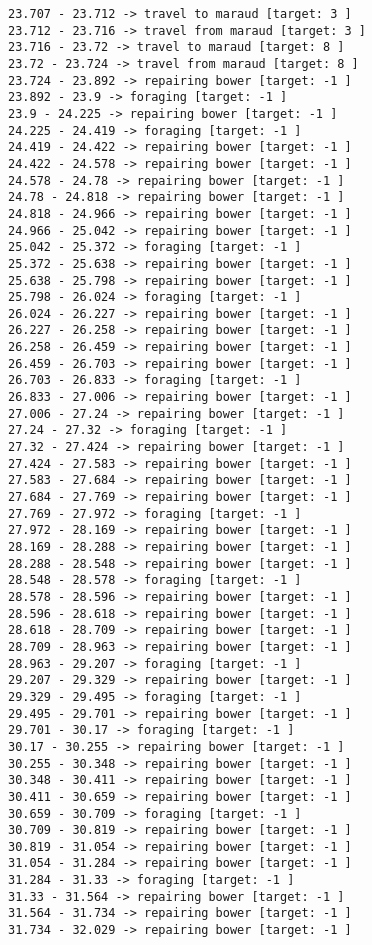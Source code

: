 \documentclass[11pt]{article}
\begin{document}
\begin{Verbatim}[commandchars=\\\{\}]
23.707 - 23.712 -> travel to maraud [target: 3 ]
23.712 - 23.716 -> travel from maraud [target: 3 ]
23.716 - 23.72 -> travel to maraud [target: 8 ]
23.72 - 23.724 -> travel from maraud [target: 8 ]
23.724 - 23.892 -> repairing bower [target: -1 ]
23.892 - 23.9 -> foraging [target: -1 ]
23.9 - 24.225 -> repairing bower [target: -1 ]
24.225 - 24.419 -> foraging [target: -1 ]
24.419 - 24.422 -> repairing bower [target: -1 ]
24.422 - 24.578 -> repairing bower [target: -1 ]
24.578 - 24.78 -> repairing bower [target: -1 ]
24.78 - 24.818 -> repairing bower [target: -1 ]
24.818 - 24.966 -> repairing bower [target: -1 ]
24.966 - 25.042 -> repairing bower [target: -1 ]
25.042 - 25.372 -> foraging [target: -1 ]
25.372 - 25.638 -> repairing bower [target: -1 ]
25.638 - 25.798 -> repairing bower [target: -1 ]
25.798 - 26.024 -> foraging [target: -1 ]
26.024 - 26.227 -> repairing bower [target: -1 ]
26.227 - 26.258 -> repairing bower [target: -1 ]
26.258 - 26.459 -> repairing bower [target: -1 ]
26.459 - 26.703 -> repairing bower [target: -1 ]
26.703 - 26.833 -> foraging [target: -1 ]
26.833 - 27.006 -> repairing bower [target: -1 ]
27.006 - 27.24 -> repairing bower [target: -1 ]
27.24 - 27.32 -> foraging [target: -1 ]
27.32 - 27.424 -> repairing bower [target: -1 ]
27.424 - 27.583 -> repairing bower [target: -1 ]
27.583 - 27.684 -> repairing bower [target: -1 ]
27.684 - 27.769 -> repairing bower [target: -1 ]
27.769 - 27.972 -> foraging [target: -1 ]
27.972 - 28.169 -> repairing bower [target: -1 ]
28.169 - 28.288 -> repairing bower [target: -1 ]
28.288 - 28.548 -> repairing bower [target: -1 ]
28.548 - 28.578 -> foraging [target: -1 ]
28.578 - 28.596 -> repairing bower [target: -1 ]
28.596 - 28.618 -> repairing bower [target: -1 ]
28.618 - 28.709 -> repairing bower [target: -1 ]
28.709 - 28.963 -> repairing bower [target: -1 ]
28.963 - 29.207 -> foraging [target: -1 ]
29.207 - 29.329 -> repairing bower [target: -1 ]
29.329 - 29.495 -> foraging [target: -1 ]
29.495 - 29.701 -> repairing bower [target: -1 ]
29.701 - 30.17 -> foraging [target: -1 ]
30.17 - 30.255 -> repairing bower [target: -1 ]
30.255 - 30.348 -> repairing bower [target: -1 ]
30.348 - 30.411 -> repairing bower [target: -1 ]
30.411 - 30.659 -> repairing bower [target: -1 ]
30.659 - 30.709 -> foraging [target: -1 ]
30.709 - 30.819 -> repairing bower [target: -1 ]
30.819 - 31.054 -> repairing bower [target: -1 ]
31.054 - 31.284 -> repairing bower [target: -1 ]
31.284 - 31.33 -> foraging [target: -1 ]
31.33 - 31.564 -> repairing bower [target: -1 ]
31.564 - 31.734 -> repairing bower [target: -1 ]
31.734 - 32.029 -> repairing bower [target: -1 ]

\end{Verbatim}
\end{document}
